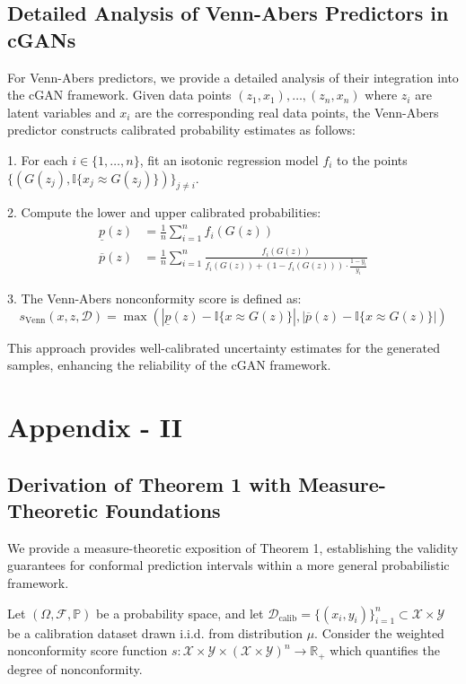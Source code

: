 \documentclass{article}
\theoremstyle{plain}
\theoremstyle{definition}
\theoremstyle{remark}
\begin{document}
\subsection{Detailed Analysis of Venn-Abers Predictors in cGANs}

For Venn-Abers predictors, we provide a detailed analysis of their integration into the cGAN framework. Given data points $(z_1, x_1), \ldots, (z_n, x_n)$ where $z_i$ are latent variables and $x_i$ are the corresponding real data points, the Venn-Abers predictor constructs calibrated probability estimates as follows:

1. For each $i \in \{1, \ldots, n\}$, fit an isotonic regression model $f_i$ to the points $\{(G(z_j), \mathbb{I}\{x_j \approx G(z_j)\})\}_{j \neq i}$.

2. Compute the lower and upper calibrated probabilities:
   \begin{align}
   \underline{p}(z) &= \frac{1}{n} \sum_{i=1}^n f_i(G(z)) \\
   \overline{p}(z) &= \frac{1}{n} \sum_{i=1}^n \frac{f_i(G(z))}{f_i(G(z)) + (1 - f_i(G(z))) \cdot \frac{1-y_i}{y_i}}
   \end{align}

3. The Venn-Abers nonconformity score is defined as:
   \begin{equation}
   s_{\text{Venn}}(x, z, \mathcal{D}) = \max(|\underline{p}(z) - \mathbb{I}\{x \approx G(z)\}|, |\overline{p}(z) - \mathbb{I}\{x \approx G(z)\}|)
   \end{equation}

This approach provides well-calibrated uncertainty estimates for the generated samples, enhancing the reliability of the cGAN framework.


\section{Appendix - II}

\subsection{Derivation of Theorem 1 with Measure-Theoretic Foundations}

We provide a measure-theoretic exposition of Theorem 1, establishing the validity guarantees for conformal prediction intervals within a more general probabilistic framework.

Let $(\Omega, \mathcal{F}, \mathbb{P})$ be a probability space, and let $\mathcal{D}_{\text{calib}} = \{(x_i, y_i)\}_{i=1}^n \subset \mathcal{X} \times \mathcal{Y}$ be a calibration dataset drawn i.i.d. from distribution $\mu$. Consider the weighted nonconformity score function $s: \mathcal{X} \times \mathcal{Y} \times (\mathcal{X} \times \mathcal{Y})^n \rightarrow \mathbb{R}_+$ which quantifies the degree of nonconformity.
\end{document}
